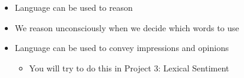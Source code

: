 \documentclass[a4paper,landscape,headrule,footrule,xetex]{foils}
\begin{document}

\begin{itemize}
\item Language can be used to reason
\item We reason unconsciously when we decide which words to use
\item Language can be used to convey impressions and opinions
  \begin{itemize}
  \item You will try to do this in Project 3: Lexical Sentiment
  \end{itemize}
\end{itemize}
\end{document}
